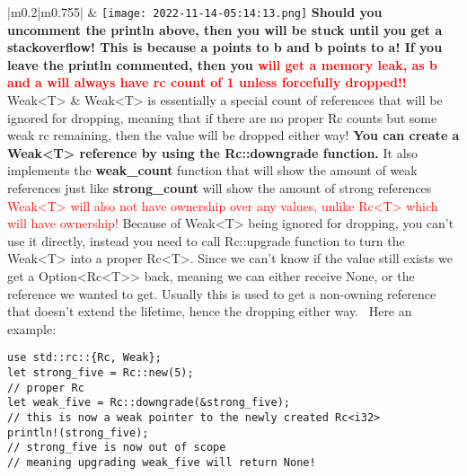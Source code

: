 \documentclass[main.tex,fontsize=8pt,paper=a4,paper=portrait,DIV=calc,]{scrartcl}
\begin{document}
\begin{table}[ht!]
\begin{tabular}{|m{0.2\linewidth}|m{0.755\linewidth}|}
\hline
&
\vspace{2mm}
\texttt{[image: 2022-11-14-05:14:13.png]}\newline 
\textbf{Should you uncomment the println above, then you will be stuck until you get a stackoverflow!\newline
This is because a points to b and b points to a!\newline
If you leave the println commented, then you \textcolor{red}{will get a memory leak, as b and a will always have rc count of 1 unless forcefully dropped!!}}
\\
\hline
Weak<T> & 
Weak<T> is essentially a special count of references that will be ignored for dropping, meaning that if there are no proper Rc counts but some weak rc remaining, then the value will be dropped either way!\newline
\textbf{You can create a Weak<T> reference by using the Rc::downgrade function.}\newline
\textcolor{OliveGreen}{It also implements the \textbf{weak\_count} function that will show the amount of weak references just like \textbf{strong\_count} will show the amount of strong references}\newline
\textcolor{red}{Weak<T> will also not have ownership over any values, unlike Rc<T> which will have ownership!}\newline
Because of Weak<T> being ignored for dropping, you can't use it directly, instead you need to call Rc::upgrade function to turn the Weak<T> into a proper Rc<T>.\newline
Since we can't know if the value still exists we get a Option<Rc<T>> back, meaning we can either receive None, or the reference we wanted to get.\newline
Usually this is used to get a non-owning reference that doesn't extend the lifetime, hence the dropping either way.\newline
\, \newline
Here an example:\newline
\begin{lstlisting}
use std::rc::{Rc, Weak};
let strong_five = Rc::new(5);
// proper Rc
let weak_five = Rc::downgrade(&strong_five);
// this is now a weak pointer to the newly created Rc<i32>
println!(strong_five);
// strong_five is now out of scope
// meaning upgrading weak_five will return None!
\end{lstlisting}

\end{tabular}
\end{table}
\end{document}
